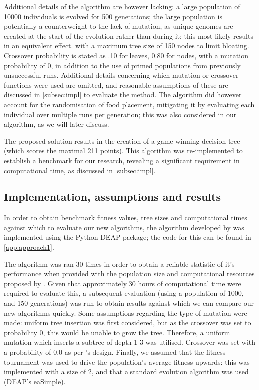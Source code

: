 \documentclass[british,10pt,a4paper]{article}
\begin{document}
Additional details of the algorithm are however lacking: a large population of 10000 individuals is evolved for 500 generations; the large population is potentially a counterweight to the lack of mutation, as unique genomes are created at the start of the evolution rather than during it; this most likely results in an equivalent effect. with a maximum tree size of 150 nodes to limit bloating. Crossover probability is stated as .10 for leaves, 0.80 for nodes, with a mutation probability of 0, in addition to the use of primed populations from previously unsuccessful runs. Additional details concerning which mutation or crossover functions were used are omitted, and reasonable assumptions of these are discussed in \autoref{subsec:impl} to evaluate the method. The algorithm did however account for the randomisation of food placement, mitigating it by evaluating each individual over multiple runs per generation; this was also considered in our algorithm, as we will later discuss.\newline

The proposed solution results in the creation of a game-winning decision tree (which scores the maximal 211 points). This algorithm was re-implemented to establish a benchmark for our research, revealing a significant requirement in computational time, as discussed in \autoref{subsec:impl}.

\subsection{Implementation, assumptions and results}
\label{subsec:impl}
In order to obtain benchmark fitness values, tree sizes and computational times against which to evaluate our new algorithms, the algorithm developed by \citeauthor{Ehlis2000-sz} was implemented using the Python DEAP \cite{deap} package; the code for this can be found in \autoref{app:approach1}. \newline

The algorithm was ran 30 times in order to obtain a reliable statistic of it's performance when provided with the population size and computational resources proposed by \citeauthor{Ehlis2000-sz}.
Given that approximately 30 hours of computational time were required to evaluate this, a subsequent evaluation (using a population of 1000, and 150 generations) was run to obtain results against which we can compare our new algorithms quickly. Some assumptions regarding the type of mutation were made: uniform tree insertion was first considered, but as the crossover was set to probability 0, this would be unable to grow the tree. Therefore, a uniform mutation which inserts a subtree of depth 1-3 was utilised. Crossover was set with a probability of 0.0 as per \citeauthor{Ehlis2000-sz}'s design. Finally, we assumed that the fitness tournament was used to drive the population's average fitness upwards: this was implemented with a size of 2, and that a standard evolution algorithm was used (DEAP's eaSimple).\newline
\end{document}
